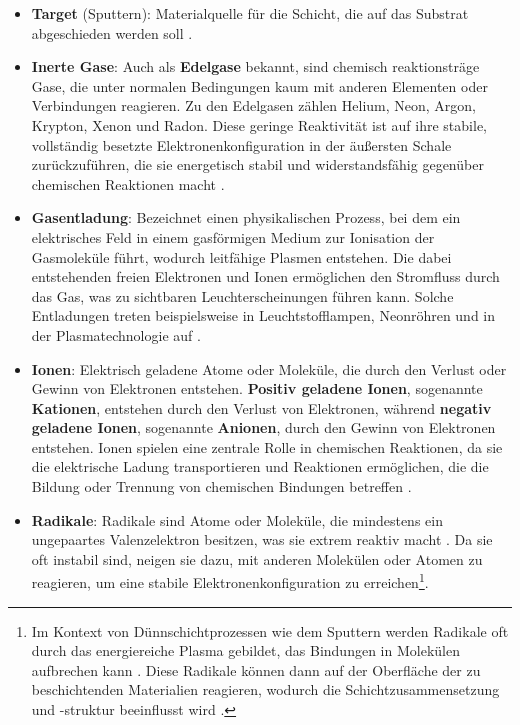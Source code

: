\documentclass{article} %
\begin{document}
\begin{itemize}
    \item \textbf{Target} (Sputtern): Materialquelle für die Schicht, die auf das Substrat abgeschieden werden soll \cite{keplinger2024}.
    \item \textbf{Inerte Gase}: Auch als \textbf{Edelgase} bekannt, sind chemisch reaktionsträge Gase, die unter normalen Bedingungen kaum mit anderen Elementen oder Verbindungen reagieren. Zu den Edelgasen zählen Helium, Neon, Argon, Krypton, Xenon und Radon. Diese geringe Reaktivität ist auf ihre stabile, vollständig besetzte Elektronenkonfiguration in der äußersten Schale zurückzuführen, die sie energetisch stabil und widerstandsfähig gegenüber chemischen Reaktionen macht \cite{atkins_physical_chemistry, zumdahl_chemistry, silberberg_chemistry}.
    \item \textbf{Gasentladung}: Bezeichnet einen physikalischen Prozess, bei dem ein elektrisches Feld in einem gasförmigen Medium zur Ionisation der Gasmoleküle führt, wodurch leitfähige Plasmen entstehen. Die dabei entstehenden freien Elektronen und Ionen ermöglichen den Stromfluss durch das Gas, was zu sichtbaren Leuchterscheinungen führen kann. Solche Entladungen treten beispielsweise in Leuchtstofflampen, Neonröhren und in der Plasmatechnologie auf \cite{prechtl2005grundlagen, boehler1994, hutchings2018}.
    \item \textbf{Ionen}: Elektrisch geladene Atome oder Moleküle, die durch den Verlust oder Gewinn von Elektronen entstehen. \textbf{Positiv geladene Ionen}, sogenannte \textbf{Kationen}, entstehen durch den Verlust von Elektronen, während \textbf{negativ geladene Ionen}, sogenannte \textbf{Anionen}, durch den Gewinn von Elektronen entstehen. Ionen spielen eine zentrale Rolle in chemischen Reaktionen, da sie die elektrische Ladung transportieren und Reaktionen ermöglichen, die die Bildung oder Trennung von chemischen Bindungen betreffen \cite{petrucci_general_chemistry, chang_chemistry, brown_chemistry_textbook}.
    \item \textbf{Radikale}: Radikale sind Atome oder Moleküle, die mindestens ein ungepaartes Valenzelektron besitzen, was sie extrem reaktiv macht \cite{atkins2010, feynman2011}. Da sie oft instabil sind, neigen sie dazu, mit anderen Molekülen oder Atomen zu reagieren, um eine stabile Elektronenkonfiguration zu erreichen\footnote{Im Kontext von Dünnschichtprozessen wie dem Sputtern werden Radikale oft durch das energiereiche Plasma gebildet, das Bindungen in Molekülen aufbrechen kann \cite{boehler1994, hutchings2018}. Diese Radikale können dann auf der Oberfläche der zu beschichtenden Materialien reagieren, wodurch die Schichtzusammensetzung und -struktur beeinflusst wird \cite{journal_reference}.}.

\end{itemize}
\end{document}
